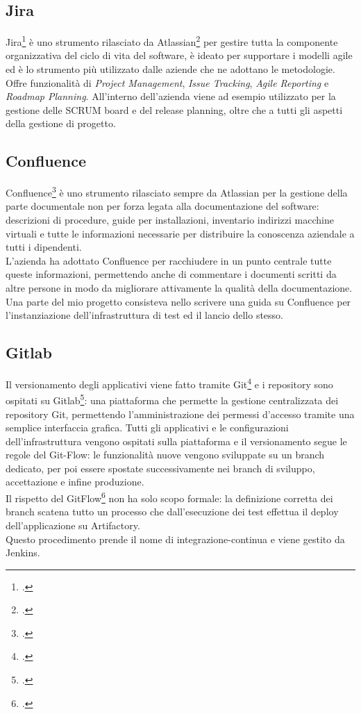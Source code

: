 \subsection{Jira}
Jira\footcite{site:jira} è uno strumento rilasciato da Atlassian\footcite{site:atlassian} per gestire tutta la componente organizzativa del ciclo di vita del software, è ideato per supportare i modelli \gls{agile} ed è lo strumento più utilizzato dalle aziende che ne adottano le metodologie. \\
Offre funzionalità di \textit{Project Management}, \textit{Issue Tracking}, \textit{Agile Reporting} e \textit{Roadmap Planning}.
All'interno dell'azienda viene ad esempio utilizzato per la gestione delle SCRUM board e del release planning, oltre che a tutti gli aspetti della gestione di progetto.
\subsection{Confluence}
Confluence\footcite{site:confluence} è uno strumento rilasciato sempre da Atlassian per la gestione della parte documentale non per forza legata alla documentazione del software: descrizioni di procedure, guide per installazioni, inventario indirizzi macchine virtuali e tutte le informazioni necessarie per distribuire la conoscenza aziendale a tutti i dipendenti. \\
L'azienda ha adottato Confluence per racchiudere in un punto centrale tutte queste informazioni, permettendo anche di commentare i documenti scritti da altre persone in modo da migliorare attivamente la qualità della documentazione. \\
Una parte del mio progetto consisteva nello scrivere una guida su Confluence per l'instanziazione dell'infrastruttura di test ed il lancio dello stesso.
\subsection{Gitlab}
Il versionamento degli applicativi viene fatto tramite Git\footcite{site:git} e i repository sono ospitati su Gitlab\footcite{site:gitlab}: una piattaforma che permette la gestione centralizzata dei repository Git, permettendo l'amministrazione dei permessi d'accesso tramite una semplice interfaccia grafica.
Tutti gli applicativi e le configurazioni dell'infrastruttura vengono ospitati sulla piattaforma e il versionamento segue le regole del Git-Flow: le funzionalità nuove vengono sviluppate su un branch dedicato, per poi essere spostate successivamente nei \gls{branch} di sviluppo, accettazione e infine produzione. \\
Il rispetto del GitFlow\footcite{article:gitflow} non ha solo scopo formale: la definizione corretta dei branch scatena tutto un processo che dall'esecuzione dei test effettua il \gls{deploy} dell'applicazione su Artifactory. \\
Questo procedimento prende il nome di \gls{integrazione-continua} e viene gestito da Jenkins.
